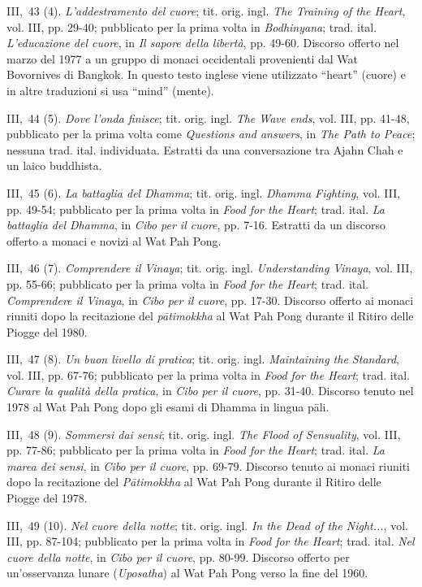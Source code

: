 III,~43 (4). \emph{L'addestramento del cuore}; tit. orig. ingl.
\emph{The Training of the Heart}, vol. III, pp. 29-40; pubblicato per la
prima volta in \emph{Bodhinyana}; trad. ital. \emph{L'educazione del
cuore}, in \emph{Il sapore della libertà}, pp. 49-60. Discorso offerto
nel marzo del 1977 a un gruppo di monaci occidentali provenienti dal Wat
Bovornives di Bangkok. In questo testo inglese viene utilizzato
``heart'' (cuore) e in altre traduzioni si usa ``mind'' (mente).

III,~44 (5). \emph{Dove l'onda finisce}; tit. orig. ingl. \emph{The Wave
ends}, vol. III, pp. 41-48, pubblicato per la prima volta come
\emph{Questions and answers}, in \emph{The Path to Peace}; nessuna trad.
ital. individuata. Estratti da una conversazione tra Ajahn Chah e un
laico buddhista.

III,~45 (6). \emph{La battaglia del Dhamma}; tit. orig. ingl.
\emph{Dhamma Fighting}, vol. III, pp. 49-54; pubblicato per la prima
volta in \emph{Food for the Heart}; trad. ital. \emph{La battaglia del
Dhamma}, in \emph{Cibo per il cuore}, pp. 7-16. Estratti da un discorso
offerto a monaci e novizi al Wat Pah Pong.

III,~46 (7). \emph{Comprendere il Vinaya}; tit. orig. ingl.
\emph{Understanding Vinaya}, vol. III, pp. 55-66; pubblicato per la
prima volta in \emph{Food for the Heart}; trad. ital. \emph{Comprendere
il Vinaya}, in \emph{Cibo per il cuore}, pp. 17-30. Discorso offerto ai
monaci riuniti dopo la recitazione del \emph{pātimokkha} al Wat Pah Pong
durante il Ritiro delle Piogge del 1980.

III,~47 (8). \emph{Un buon livello di pratica}; tit. orig. ingl.
\emph{Maintaining the Standard}, vol. III, pp. 67-76; pubblicato per la
prima volta in \emph{Food for the Heart}; trad. ital. \emph{Curare la
qualità della pratica}, in \emph{Cibo per il cuore}, pp. 31-40. Discorso
tenuto nel 1978 al Wat Pah Pong dopo gli esami di Dhamma in lingua pāli.

III,~48 (9). \emph{Sommersi dai sensi}; tit. orig. ingl. \emph{The Flood
of Sensuality}, vol. III, pp. 77-86; pubblicato per la prima volta in
\emph{Food for the Heart}; trad. ital. \emph{La marea dei sensi}, in
\emph{Cibo per il cuore}, pp. 69-79. Discorso tenuto ai monaci riuniti
dopo la recitazione del \emph{Pātimokkha} al Wat Pah Pong durante il
Ritiro delle Piogge del 1978.

III,~49 (10). \emph{Nel cuore della notte}; tit. orig. ingl. \emph{In
the Dead of the Night...}, vol. III, pp. 87-104; pubblicato per la prima
volta in \emph{Food for the Heart}; trad. ital. \emph{Nel cuore della
notte}, in \emph{Cibo per il cuore}, pp. 80-99. Discorso offerto per
un'osservanza lunare (\emph{Uposatha}) al Wat Pah Pong verso la fine del
1960.

